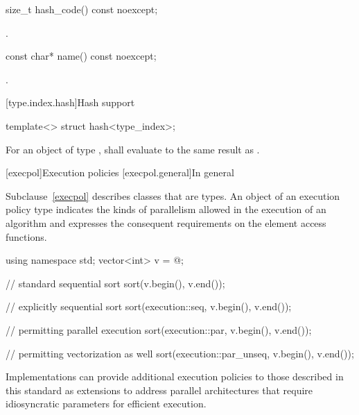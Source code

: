 %
\begin{itemdecl}
size_t hash_code() const noexcept;
\end{itemdecl}

\begin{itemdescr}
\pnum
\returns
{}.
\end{itemdescr}

%
\begin{itemdecl}
const char* name() const noexcept;
\end{itemdecl}

\begin{itemdescr}
\pnum
\returns
{}.
\end{itemdescr}

[type.index.hash]{Hash support}

%
\begin{itemdecl}
template<> struct hash<type_index>;
\end{itemdecl}

\begin{itemdescr}
\pnum
For an object  of type ,
 shall evaluate to the same result as .
\end{itemdescr}

[execpol]{Execution policies}
[execpol.general]{In general}

\pnum
Subclause~\ref{execpol} describes classes that are  types. An
object of an execution policy type indicates the kinds of parallelism allowed
in the execution of an algorithm and expresses the consequent requirements on
the element access functions.
\begin{example}
\begin{codeblock}
using namespace std;
vector<int> v = @\commentellip@;

// standard sequential sort
sort(v.begin(), v.end());

// explicitly sequential sort
sort(execution::seq, v.begin(), v.end());

// permitting parallel execution
sort(execution::par, v.begin(), v.end());

// permitting vectorization as well
sort(execution::par_unseq, v.begin(), v.end());
\end{codeblock}
\end{example}
\begin{note}
Implementations can provide additional execution policies
to those described in this standard as extensions
to address parallel architectures that require idiosyncratic
parameters for efficient execution.
\end{note}

